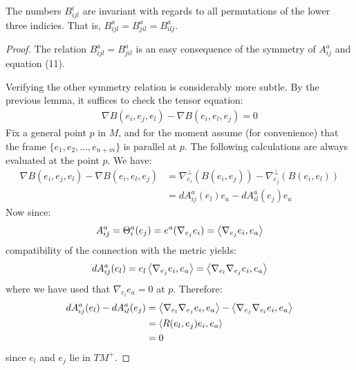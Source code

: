 \begin{cor}  The numbers $B^i_{ijl}$ are invariant with regards to all permutations of the lower three indicies.  That is, $B^a_{ijl} = B^a_{jil} = B^a_{ilj}$. 
\end{cor}  
%
\begin{proof} The relation $B^a_{ijl} = B^a_{jil}$ is an easy consequence of the symmetry of $A^a_{ij}$ and equation (11). 

Verifying the other symmetry relation is considerably more subtle.  By the previous lemma, it suffices to check the tensor equation:
%
\begin{align*}
\nabla B (e_i, e_j, e_l) - \nabla B (e_i, e_l, e_j ) = 0
\end{align*}
%
Fix a general point $p$ in $M$, and for the moment assume (for convenience) that the frame $\{ e_1, e_2, \ldots, e_{n+m} \}$ is parallel at $p$.  The following calculations are always evaluated at the point $p$.  We have:
%
\begin{align*}
\nabla B (e_i, e_j, e_l) - \nabla B (e_i, e_l, e_j ) &= \nabla^{\perp}_{e_l}( B(e_i, e_j) ) - \nabla^{\perp}_{e_j}( B(e_i, e_l) )\\
&= d A^a_{ij} (e_l) e_a - d A^a_{il} (e_j) e_a
\end{align*}
%
Now since:
%
\begin{align*}
A^a_{ij} = \Theta^a_i (e_j) = e^a( \nabla_{e_j} e_i ) = \left\langle \nabla_{e_j} e_i, e_a \right\rangle
\end{align*}
%
compatibility of the connection with the metric yields:
%
\begin{align*}
d A^a_{ij} (e_l) = e_l \left\langle \nabla_{e_j} e_i, e_a \right\rangle = \left\langle \nabla_{e_l} \nabla_{e_j} e_i, e_a \right\rangle
\end{align*}
%
where we have used that $\nabla_{e_l} e_{a} = 0$ at $p$.  Therefore:
%
\begin{align*}
d A^a_{ij} (e_l) - d A^a_{il} (e_j) &= \left\langle \nabla_{e_l} \nabla_{e_j} e_i, e_a \right\rangle - \left\langle \nabla_{e_j} \nabla_{e_l} e_i, e_a \right\rangle \\
&= \left\langle R(e_l, e_j) e_i, e_a \right\rangle \\
&= 0
\end{align*}
%
since $e_l$ and $e_j$ lie in $TM^{+}$.
%
\end{proof}

